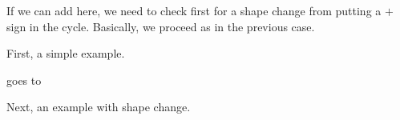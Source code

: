 \documentclass[12pt]{article}
\numberwithin{equation}{section}
\newcommand{\horizontalDominoMaybe}[3]{\filldraw [dominoMaybeStyle] (#2 - 1 + \eps, #1 - 1 + \eps) rectangle + (2 - \teps, 1 -\teps) node [dominoText] {$#3$};}
\newcommand{\verticalDominoMaybe}[3]{\filldraw [dominoMaybeStyle] (#2 - 1 + \eps,  #1 - 1 + \eps) rectangle + (1 - \teps,2 -\teps) node [dominoText] {$#3$};}
\newcommand{\horizontalDominoMaybeShift}[4]{\filldraw [dominoMaybeStyle] (#2 - 1 + #4 + \eps, #1 - 1 + \eps) rectangle + (2 - \teps, 1 -\teps) node [dominoText] {$#3$};}
\begin{document}
\begin{itemize}
    If we can add here, we need to check first for a shape change from putting a $+$ sign in the cycle.
    Basically, we proceed as in the previous case.

    First, a simple example.
    \begin{figure}[H]
      \centering
    \end{figure}
    goes to
    \begin{figure}[H]
      \centering
    \end{figure}
    Next, an example with shape change.
    \begin{figure}[H]
      \centering
\end{figure}
\end{itemize}
\end{document}
